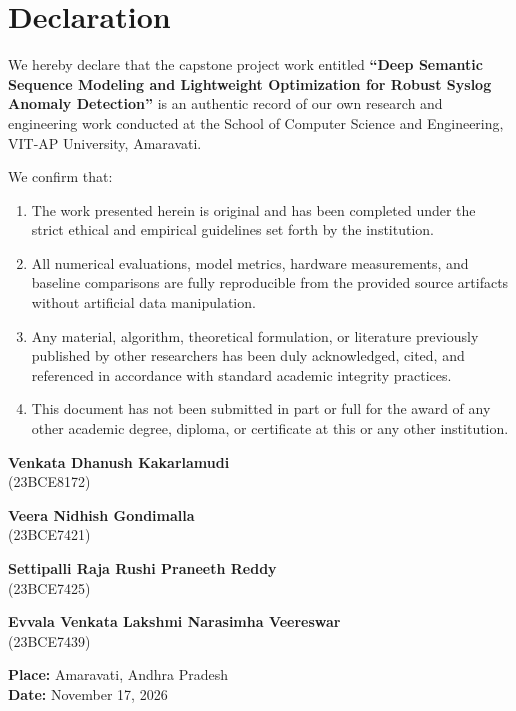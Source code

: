 \chapter*{Declaration}

\noindent We hereby declare that the capstone project work entitled \textbf{``Deep Semantic Sequence Modeling and Lightweight Optimization for Robust Syslog Anomaly Detection''} is an authentic record of our own research and engineering work conducted at the School of Computer Science and Engineering, VIT-AP University, Amaravati.

\noindent We confirm that:
\begin{enumerate}
    \item The work presented herein is original and has been completed under the strict ethical and empirical guidelines set forth by the institution.
    \item All numerical evaluations, model metrics, hardware measurements, and baseline comparisons are fully reproducible from the provided source artifacts without artificial data manipulation.
    \item Any material, algorithm, theoretical formulation, or literature previously published by other researchers has been duly acknowledged, cited, and referenced in accordance with standard academic integrity practices.
    \item This document has not been submitted in part or full for the award of any other academic degree, diploma, or certificate at this or any other institution.
\end{enumerate}

\vspace{2.5cm}

\noindent
\begin{minipage}{0.45\textwidth}
    \centering
    \textbf{Venkata Dhanush Kakarlamudi}\\
    (23BCE8172)
\end{minipage}
\hfill
\begin{minipage}{0.45\textwidth}
    \centering
    \textbf{Veera Nidhish Gondimalla}\\
    (23BCE7421)
\end{minipage}

\vspace{1.8cm}

\noindent
\begin{minipage}{0.45\textwidth}
    \centering
    \textbf{Settipalli Raja Rushi Praneeth Reddy}\\
    (23BCE7425)
\end{minipage}
\hfill
\begin{minipage}{0.45\textwidth}
    \centering
    \textbf{Evvala Venkata Lakshmi Narasimha Veereswar}\\
    (23BCE7439)
\end{minipage}

\vspace{2.0cm}

\noindent \textbf{Place:} Amaravati, Andhra Pradesh \\
\textbf{Date:} November 17, 2026

